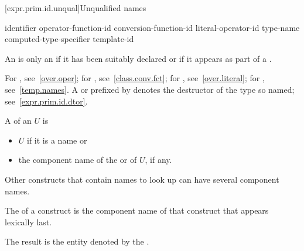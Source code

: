[expr.prim.id.unqual]{Unqualified names}

\begin{bnf}
\br
    identifier\br
    operator-function-id\br
    conversion-function-id\br
    literal-operator-id\br
    \terminal{\~} type-name\br
    \terminal{\~} computed-type-specifier\br
    template-id
\end{bnf}

\pnum
{}%
An  is only
an  if it has
been suitably declared
or if it appears as part of a .
\begin{note}
For , see~\ref{over.oper}; for
, see~\ref{class.conv.fct}; for
, see~\ref{over.literal}; for
, see~\ref{temp.names}.
A  or 
prefixed by \tcode{\~} denotes the destructor of the type so named;
see~\ref{expr.prim.id.dtor}.
\end{note}

\pnum
A  of an  $U$ is
\begin{itemize}
\item
$U$ if it is a name or
\item
the component name of
the  or  of $U$, if any.
\end{itemize}
\begin{note}
Other constructs that contain names to look up can have several
component names.
\end{note}
The  of a construct is
the component name of that construct that appears lexically last.

\pnum
The result is the entity denoted by
the .

